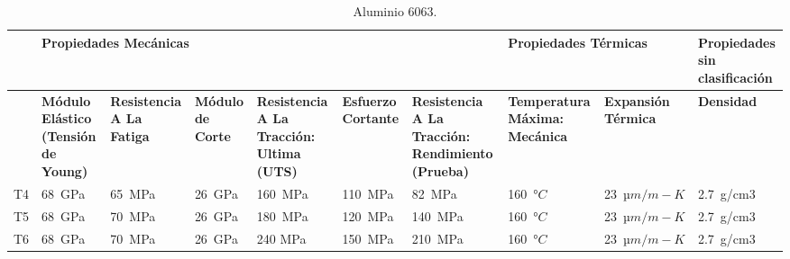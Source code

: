 \newpage
\begin{landscape}
	\begin{table}[H]
		\centering
		\small
		\caption{Aluminio 6063.}
		\begin{tabular}{|p{1.5em}|p{5.355em}|p{5.355em}|p{5.355em}|p{5.355em}|p{4.645em}|p{7em}|p{6.285em}|p{5.8em}|p{5.93em}|}
			\hline
			\multicolumn{1}{|r|}{} & \multicolumn{6}{p{39.995em}|}{\cellcolor[rgb]{ .851,  .882,  .949}\textbf{Propiedades Mecánicas}} & \multicolumn{2}{p{13.64em}|}{\cellcolor[rgb]{ .988,  .894,  .839}\textbf{Propiedades Térmicas}} & \cellcolor[rgb]{ 1,  .949,  .8}\textbf{Propiedades sin clasificación} \\
			\hline
			\multicolumn{1}{|r|}{} & \cellcolor[rgb]{ .851,  .882,  .949}\textbf{Módulo Elástico (Tensión de Young)} & \cellcolor[rgb]{ .851,  .882,  .949}\textbf{Resistencia A La Fatiga} & \cellcolor[rgb]{ .851,  .882,  .949}\textbf{Módulo de Corte} & \cellcolor[rgb]{ .851,  .882,  .949}\textbf{Resistencia A La Tracción: Ultima (UTS)} & \cellcolor[rgb]{ .851,  .882,  .949}\textbf{Esfuerzo Cortante} & \cellcolor[rgb]{ .851,  .882,  .949}\textbf{Resistencia A La Tracción: Rendimiento (Prueba)} & \cellcolor[rgb]{ .988,  .894,  .839}\textbf{Temperatura Máxima: Mecánica} & \cellcolor[rgb]{ .988,  .894,  .839}\textbf{Expansión Térmica} & \cellcolor[rgb]{ 1,  .949,  .8}\textbf{Densidad} \\
			\hline
			T4    & 68 GPa & 65 MPa & 26 GPa & 160 MPa & 110 MPa & 82 MPa & 160 $°C$ & 23 $µm/m-K$ & 2.7 g/cm3 \\
			\hline
			T5    & 68 GPa & 70 MPa & 26 GPa & 180 MPa & 120 MPa & 140 MPa & 160 $°C$ & 23 $µm/m-K$ & 2.7 g/cm3 \\
			\hline
			T6    & 68 GPa & 70 MPa & 26 GPa & 240 MPa & 150 MPa & 210 MPa & 160 $°C$ & 23 $µm/m-K$ & 2.7 g/cm3 \\
			\hline
		\end{tabular}%
		\label{tab:Alu6063}%
		
	\end{table}%
\end{landscape}

\bigskip






\endinput 